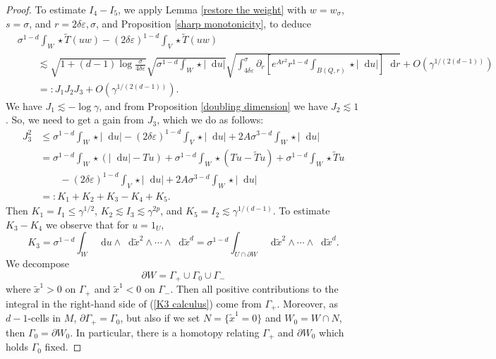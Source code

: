 \documentclass[reqno,12pt,letterpaper]{amsart}
\newcommand*\dif{\mathop{}\!\mathrm{d}}
\theoremstyle{definition}
\numberwithin{equation}{section}
\begin{document}
\begin{proof}
To estimate $I_4 - I_5$, we apply Lemma \ref{restore the weight} with $w = w_\sigma$, $s = \sigma$, and $r = 2\delta\varepsilon, \sigma$, and Proposition \ref{sharp monotonicity}, to deduce
\begin{align*}
&\sigma^{1 - d} \int_W \star \tilde T(uw) - (2\delta\varepsilon)^{1 - d} \int_V \star \tilde T(uw) \\
&\qquad \lesssim \sqrt{1 + (d - 1) \log \frac{\sigma}{4\delta\varepsilon}} \sqrt{\sigma^{1 - d} \int_W \star |\dif u|} \sqrt{\int_{4\delta\varepsilon}^\sigma \partial_r \left[e^{Ar^2} r^{1 - d} \int_{B(Q, r)} \star |\dif u|\right] \dif r} + O(\gamma^{1/(2(d - 1))})\\
&\qquad =: J_1 J_2 J_3 + O(\gamma^{1/(2(d - 1))}).
\end{align*}
We have $J_1 \lesssim -\log \gamma$, and from Proposition \ref{doubling dimension} we have $J_2 \lesssim 1$.
So, we need to get a gain from $J_3$, which we do as follows:
\begin{align*}
J_3^2 &\leq \sigma^{1 - d} \int_W \star |\dif u| - (2 \delta \varepsilon)^{1 - d} \int_V \star |\dif u| + 2A\sigma^{3 - d} \int_W \star |\dif u| \\
&= \sigma^{1 - d} \int_W \star (|\dif u| - Tu) + \sigma^{1 - d} \int_W \star (Tu - \tilde Tu) + \sigma^{1 - d} \int_W \star \tilde Tu \\
&\qquad - (2 \delta\varepsilon)^{1 - d} \int_V \star |\dif u| + 2A \sigma^{3 - d} \int_W \star |\dif u| \\
&=: K_1 + K_2 + K_3 - K_4 + K_5.
\end{align*}
Then $K_1 = I_1 \leq \gamma^{1/2}$, $K_2 \lesssim I_3 \lesssim \gamma^{2p}$, and $K_5 = I_2 \lesssim \gamma^{1/(d - 1)}$.
To estimate $K_3 - K_4$ we observe that for $u = 1_U$,
\begin{equation}\label{K3 calculus}
K_3 = \sigma^{1 - d} \int_W \dif u \wedge \dif \tilde x^2 \wedge \cdots \wedge \dif \tilde x^d = \sigma^{1 - d} \int_{U \cap \partial W} \dif \tilde x^2 \wedge \cdots \wedge \dif \tilde x^d.
\end{equation}
We decompose
$$\partial W = \Gamma_+ \cup \Gamma_0 \cup \Gamma_-$$
where $\tilde x^1 > 0$ on $\Gamma_+$ and $\tilde x^1 < 0$ on $\Gamma_-$. Then all positive contributions to the integral in the right-hand side of (\ref{K3 calculus}) come from $\Gamma_+$.
Moreover, as $d-1$-cells in $M$, $\partial \Gamma_+ = \Gamma_0$, but also if we set $N = \{\tilde x^1 = 0\}$ and $W_0 = W \cap N$, then $\Gamma_0 = \partial W_0$.
In particular, there is a homotopy relating $\Gamma_+$ and $\partial W_0$ which holds $\Gamma_0$ fixed.

\end{proof}
\end{document}
